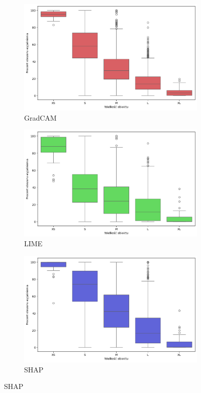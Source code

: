 \begin{figure}
	\centering
	\begin{subfigure}{0.3\textwidth}
		\centering\includegraphics[width=.9\textwidth]{img/areaincorrect_size_gradcam}
		\caption{GradCAM}  \label{rys:areaincorrect_size_gradcam}
	\end{subfigure}
	\begin{subfigure}{0.3\textwidth}
		\centering\includegraphics[width=.9\textwidth]{img/areaincorrect_size_lime}
		\caption{LIME}  \label{rys:areaincorrect_size_lime}
	\end{subfigure}
	\begin{subfigure}{0.3\textwidth}
		\centering\includegraphics[width=.9\textwidth]{img/areaincorrect_size_shap}
		\caption{SHAP}  \label{rys:areaincorrect_size_shap}
	\end{subfigure}
	\label{rys:areaincorrect_size}
\end{figure}


